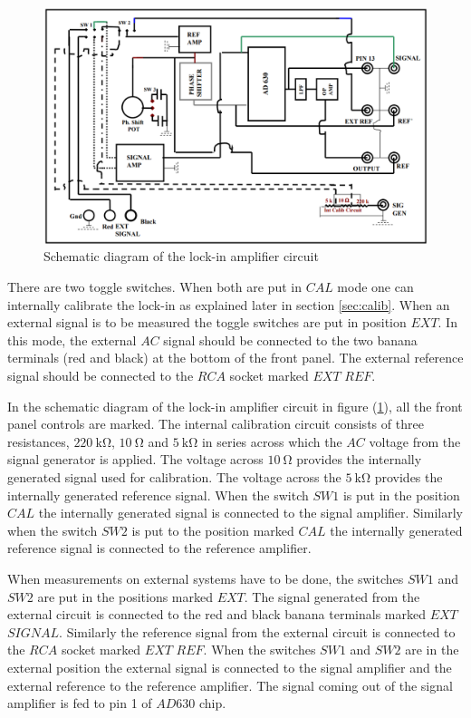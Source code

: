 \documentclass[%
 reprint,
nofootinbib,
 amsmath,amssymb,
 aps,
]{revtex4-2}
\begin{document}
    \begin{figure}
        \centering
        \includegraphics[scale = 0.75]{Figures/schematic.png}
        \caption{Schematic diagram of the lock-in amplifier circuit}
        \label{fig:schematic}
    \end{figure}
    \par
    There are two toggle switches. When both are put in $CAL$ mode one can  internally calibrate the lock-in as explained later in section \ref{sec:calib}. When an external signal is to be measured the toggle switches are put in position $EXT$. In this mode, the external $AC$ signal should be connected to the two banana terminals (red and black) at the bottom of the front panel. The external reference signal should be connected to the $RCA$ socket marked $EXT$ $REF$.
    \par
    In the schematic diagram of the lock-in amplifier circuit in figure (\ref{fig:schematic}), all the front panel controls are marked. The internal calibration circuit consists of three resistances, $\SI{220}{\kilo \ohm}$, $\SI{10}{\ohm}$ and $\SI{5}{\kilo \ohm}$ in series across which the $AC$ voltage from the signal generator is applied. The voltage across $\SI{10}{\ohm}$ provides the internally generated signal used for calibration. The voltage across the $\SI{5}{\kilo \ohm}$ provides the internally generated reference signal. When the switch $SW 1$ is put in the position $CAL$ the internally generated signal is connected to the signal amplifier. Similarly when the switch $SW2$ is put to the position marked $CAL$ the internally generated reference signal is connected to the reference amplifier.
    \par
    When measurements on external systems have to be done, the switches $SW1$ and $SW2$ are put in the positions marked $EXT$. The signal generated from the external circuit is connected to the red and black banana terminals marked $EXT$ $SIGNAL$. Similarly the reference signal from the external circuit is connected to the $RCA$ socket marked $EXT$ $REF$. When the switches $SW1$ and $SW2$ are in the external position the external signal is connected to the signal amplifier and the external reference to the reference amplifier. The signal coming out of the signal amplifier is fed to pin 1 of $AD630$ chip.
\end{document}
